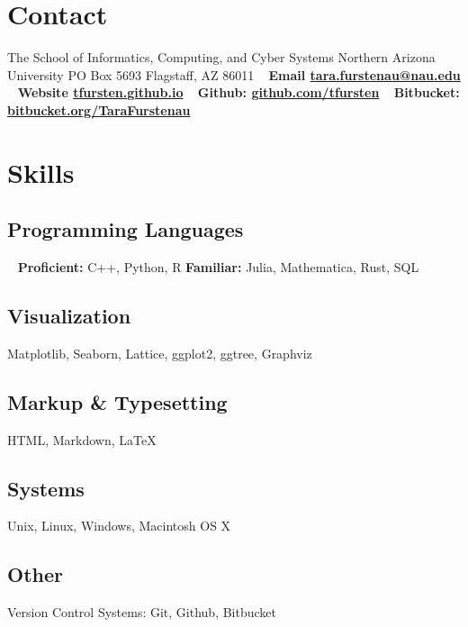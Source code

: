 \documentclass[]{cv-style}          %
\begin{document}
\lastupdated


\begin{aside}
%
\section{Contact}
The School of Informatics, Computing, and Cyber Systems
Northern Arizona University
PO Box 5693
Flagstaff, AZ 86011
~
\textbf{Email \textbf{\Letter}
\href{mailto:tara.furstenau@nau.edu}{tara.furstenau@nau.edu}}
~
\textbf{Website \textbf{\Mundus}
\href{http://tfursten.github.io}{tfursten.github.io}}
~
\textbf{Github:
\href{https://github.com/tfursten}{github.com/tfursten}}
~
\textbf{Bitbucket:
\href{https://bitbucket.org/TaraFurstenau}{bitbucket.org/TaraFurstenau}}
%
\section{Skills}
\subsection{Programming Languages}
~
\textbf{Proficient:} C++, Python, R\newline
\textbf{Familiar:} Julia, Mathematica, Rust, SQL
\subsection{Visualization}
Matplotlib, Seaborn, Lattice, ggplot2, ggtree, Graphviz
\subsection{Markup \& Typesetting}
HTML, Markdown, \LaTeX
\subsection{Systems}
Unix, Linux, Windows, Macintosh OS X
\subsection{Other}
Version Control Systems: Git, Github, Bitbucket
%
\end{aside}
\end{document}
